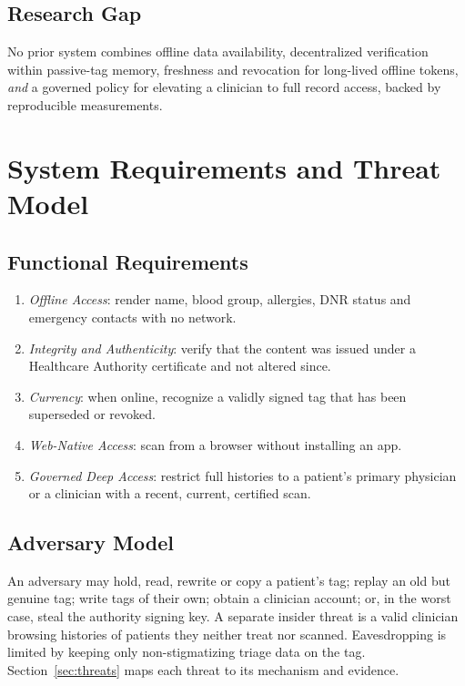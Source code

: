 \documentclass[conference]{IEEEtran}
\begin{document}
\subsection{Research Gap}
No prior system combines offline data availability, decentralized verification within passive-tag memory, freshness and revocation for long-lived offline tokens, \emph{and} a governed policy for elevating a clinician to full record access, backed by reproducible measurements.

\section{System Requirements and Threat Model}
\label{sec:requirements}

\subsection{Functional Requirements}
\begin{enumerate}
\item \textit{Offline Access}: render name, blood group, allergies, DNR status and emergency contacts with no network.
\item \textit{Integrity and Authenticity}: verify that the content was issued under a Healthcare Authority certificate and not altered since.
\item \textit{Currency}: when online, recognize a validly signed tag that has been superseded or revoked.
\item \textit{Web-Native Access}: scan from a browser without installing an app.
\item \textit{Governed Deep Access}: restrict full histories to a patient's primary physician or a clinician with a recent, current, certified scan.
\end{enumerate}

\subsection{Adversary Model}
An adversary may hold, read, rewrite or copy a patient's tag; replay an old but genuine tag; write tags of their own; obtain a clinician account; or, in the worst case, steal the authority signing key. A separate insider threat is a valid clinician browsing histories of patients they neither treat nor scanned. Eavesdropping is limited by keeping only non-stigmatizing triage data on the tag. Section~\ref{sec:threats} maps each threat to its mechanism and evidence.
\end{document}
